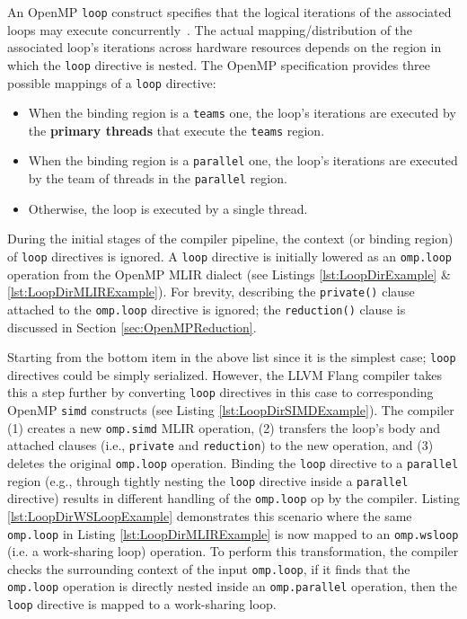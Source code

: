 \documentclass[acmtog,natbib=false]{acmart}
\newcommand{\code}[1]{\texttt{#1}\xspace}
\begin{document}
An OpenMP \code{loop} construct specifies that the logical iterations of the associated loops may execute concurrently~\cite{OARB21}.
The actual mapping/distribution of the associated loop's iterations across hardware resources depends on the region in which the \code{loop} directive is nested.
The OpenMP specification provides three possible mappings of a \code{loop} directive:
\begin{itemize}
    \item When the binding region is a \code{teams} one, the loop's iterations are executed by the \textbf{primary threads} that execute the \code{teams} region.
    \item When the binding region is a \code{parallel} one, the loop's iterations are executed by the team of threads in the \code{parallel} region.
    \item Otherwise, the loop is executed by a single thread.
\end{itemize}
During the initial stages of the compiler pipeline, the context (or binding region) of \code{loop} directives is ignored.
A \code{loop} directive is initially lowered as an \code{omp.loop} operation from the OpenMP \ac{MLIR} dialect (see Listings \ref{lst:LoopDirExample} \& \ref{lst:LoopDirMLIRExample}).
For brevity, describing the \code{private()} clause attached to the \code{omp.loop} directive is ignored; the \code{reduction()} clause is discussed in Section \ref{sec:OpenMPReduction}.

Starting from the bottom item in the above list since it is the simplest case; \code{loop} directives could be simply serialized.
However, the LLVM Flang compiler takes this a step further by converting \code{loop} directives in this case to corresponding OpenMP \code{simd} constructs (see Listing \ref{lst:LoopDirSIMDExample}).
The compiler (1) creates a new \code{omp.simd} \ac{MLIR} operation, (2) transfers the loop's body and attached clauses (i.e., \code{private} and \code{reduction}) to the new operation, and (3) deletes the original \code{omp.loop} operation.
Binding the \code{loop} directive to a \code{parallel} region (e.g., through tightly nesting the \code{loop} directive inside a \code{parallel} directive) results in different handling of the \code{omp.loop} op by the compiler.
Listing \ref{lst:LoopDirWSLoopExample} demonstrates this scenario where the same \code{omp.loop} in Listing \ref{lst:LoopDirMLIRExample} is now mapped to an \code{omp.wsloop} (i.e. a work-sharing loop) operation.
To perform this transformation, the compiler checks the surrounding context of the input \code{omp.loop}, if it finds that the \code{omp.loop} operation is directly nested inside an \code{omp.parallel} operation, then the \code{loop} directive is mapped to a work-sharing loop.
\end{document}
